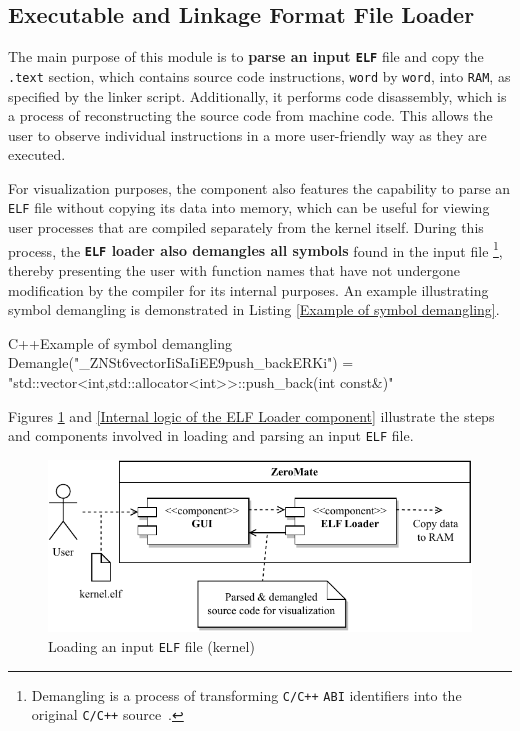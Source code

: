 \documentclass[english, ing, kiv, he, iso690numb, pdf]{fasthesis}
\begin{document}
	\newpage
	
	\subsection{Executable and Linkage Format File Loader} \label{ELF Loader}
	
	The main purpose of this module is to \textbf{parse an input \texttt{ELF}} file and copy the \texttt{.text} section, which contains source code instructions, \texttt{word} by \texttt{word}, into \texttt{RAM}, as specified by the linker script. Additionally, it performs code disassembly, which is a process of reconstructing the source code from machine code. This allows the user to observe individual instructions in a more user-friendly way as they are executed.
	
	For visualization purposes, the component also features the capability to parse an \texttt{ELF} file without copying its data into memory, which can be useful for viewing user processes that are compiled separately from the kernel itself. During this process, the \textbf{\texttt{ELF} loader also demangles all symbols} found in the input file \footnote{Demangling is a process of transforming \texttt{C/C++} \texttt{ABI} identifiers into the original \texttt{C/C++} source~\cite{demangling}.}, thereby presenting the user with function names that have not undergone modification by the compiler for its internal purposes. An example illustrating symbol demangling is demonstrated in Listing \ref{Example of symbol demangling}.
	
\begin{code}{C++}{Example of symbol demangling \label{Example of symbol demangling}}
Demangle("_ZNSt6vectorIiSaIiEE9push_backERKi") = 
"std::vector<int,std::allocator<int>>::push_back(int const&)"
\end{code}
	
	Figures \ref{Loading an input ELF file (kernel)} and \ref{Internal logic of the ELF Loader component} illustrate the steps and components involved in loading and parsing an input \texttt{ELF} file.
	
	\begin{figure}[ht]
		\centering
		\includegraphics[width=.9\textwidth]{img/diagrams/elf_diagram_2.pdf}
		\caption{Loading an input \texttt{ELF} file (kernel)}
		\label{Loading an input ELF file (kernel)}
	\end{figure}
	
\end{document}

